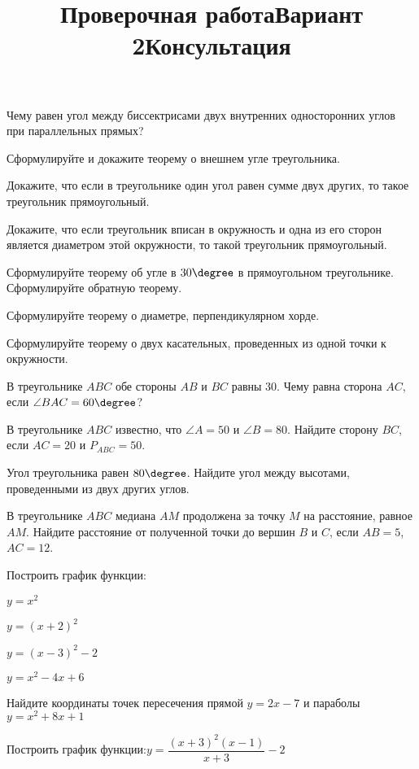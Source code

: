 \newpage
\title{Проверочная работа}
\title{Вариант 2}
\begin{listofex}
	\item
	\begin{enumcols}[itemcolumns=1]
		\item Чему равен угол между биссектрисами двух внутренних односторонних углов при параллельных прямых?
		\item Сформулируйте и докажите теорему о внешнем угле треугольника.
		\item Докажите, что если в треугольнике один угол равен сумме двух других, то такое треугольник прямоугольный.
		\item Докажите, что если треугольник вписан в окружность и одна из его сторон является диаметром этой окружности, то такой треугольник прямоугольный.
		\item Сформулируйте теорему об угле в \( 30\degree \) в прямоугольном треугольнике. Сформулируйте обратную теорему.
		\item Сформулируйте теорему о диаметре, перпендикулярном хорде.
		\item Сформулируйте теорему о двух касательных, проведенных из одной точки к окружности.
	\end{enumcols}
	\item В треугольнике \( ABC \) обе стороны \( AB \) и \( BC \) равны \( 30 \). Чему равна сторона \( AC \), если \( \angle BAC = 60 \degree \)?
	\item В треугольнике \( ABC \) известно, что \( \angle A = 50 \) и \( \angle B = 80 \). Найдите сторону \( BC \), если \( AC = 20 \) и \( P_{ABC}=50 \).
	\item Угол треугольника равен \( 80\degree \). Найдите угол между высотами, проведенными из двух других углов.
	\item {}
	\item {}
	\item В треугольнике \( ABC \) медиана \( AM \) продолжена за точку \( M \) на расстояние, равное \( AM \). Найдите расстояние от полученной точки до вершин \( B  \) и \( C\), если \( AB = 5\), \( AC = 12\).
	\item {}
\end{listofex}
\newpage
\title{Консультация}
\begin{listofex}
	\item Построить график функции:
	\begin{enumcols}[itemcolumns=2]
		\item \( y=x^2 \)
		\item \( y=(x+2)^2 \)
		\item \( y=(x-3)^2-2 \)
		\item \( y=x^2-4x+6 \)
	\end{enumcols}
	\item Найдите координаты точек пересечения прямой \( y=2x-7 \) и параболы \( y=x^2+8x+1 \)
	\item Построить график функции:\quad\( y=\dfrac{(x+3)^2(x-1)}{x+3}-2 \)
\end{listofex}
